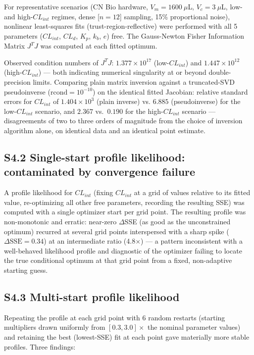 \documentclass[11pt]{article}
\begin{document}
For representative scenarios (CN Bio hardware, $V_m=1600\ \mu$L, $V_c=3\ \mu$L, low- and high-$CL_{int}$ regimes, dense [$n=12$] sampling, 15\% proportional noise), nonlinear least-squares fits (trust-region-reflective) were performed with all 5 parameters ($CL_{int}$, $CL_d$, $K_p$, $k_b$, $e$) free. The Gauss-Newton Fisher Information Matrix $J^TJ$ was computed at each fitted optimum.

Observed condition numbers of $J^TJ$: $1.377\times10^{17}$ (low-$CL_{int}$) and $1.447\times10^{12}$ (high-$CL_{int}$) --- both indicating numerical singularity at or beyond double-precision limits. Comparing plain matrix inversion against a truncated-SVD pseudoinverse ($\text{rcond}=10^{-10}$) on the identical fitted Jacobian: relative standard errors for $CL_{int}$ of $1.404\times10^3$ (plain inverse) vs. $6.885$ (pseudoinverse) for the low-$CL_{int}$ scenario, and $2.367$ vs.\ $0.190$ for the high-$CL_{int}$ scenario --- disagreements of two to three orders of magnitude from the choice of inversion algorithm alone, on identical data and an identical point estimate.

\subsection*{S4.2 Single-start profile likelihood: contaminated by convergence failure}

A profile likelihood for $CL_{int}$ (fixing $CL_{int}$ at a grid of values relative to its fitted value, re-optimizing all other free parameters, recording the resulting SSE) was computed with a single optimizer start per grid point. The resulting profile was non-monotonic and erratic: near-zero $\Delta$SSE (as good as the unconstrained optimum) recurred at several grid points interspersed with a sharp spike ($\Delta\text{SSE}=0.34$) at an intermediate ratio (4.8$\times$) --- a pattern inconsistent with a well-behaved likelihood profile and diagnostic of the optimizer failing to locate the true conditional optimum at that grid point from a fixed, non-adaptive starting guess.

\subsection*{S4.3 Multi-start profile likelihood}

Repeating the profile at each grid point with 6 random restarts (starting multipliers drawn uniformly from $[0.3, 3.0]\times$ the nominal parameter values) and retaining the best (lowest-SSE) fit at each point gave materially more stable profiles. Three findings:
\end{document}
